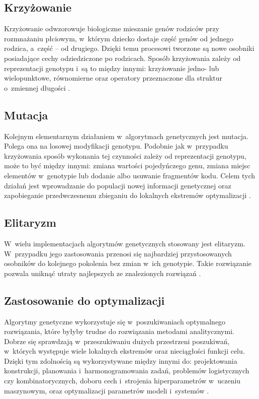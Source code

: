 \tocless\subsection{Krzyżowanie}
Krzyżowanie odwzorowuje biologiczne mieszanie
genów rodziców przy rozmnażaniu płciowym,
w~którym dziecko dostaje część genów
od jednego rodzica, a~część -- od drugiego.
Dzięki temu procesowi tworzone są nowe osobniki
posiadające cechy odziedziczone po rodzicach.
Sposób krzyżowania zależy od reprezentacji genotypu
i~są to między innymi:
krzyżowanie jedno- lub wielopunktowe,
równomierne oraz operatory przeznaczone
dla struktur o~zmiennej długości%
.

\tocless\subsection{Mutacja}
Kolejnym elementarnym działaniem
w~algorytmach genetycznych jest mutacja.
Polega ona na losowej modyfikacji genotypu.
Podobnie jak w~przypadku krzyżowania
sposób wykonania tej czynności zależy
od reprezentacji genotypu,
może to być między innymi:
zmiana wartości pojedyńczego genu,
zmiana miejsc elementów w~genotypie
lub dodanie albo usuwanie
fragmentów kodu.
Celem tych działań jest
wprowadzanie do populacji
nowej informacji genetycznej
oraz zapobieganie przedwczesnemu zbieganiu
do lokalnych ekstremów optymalizacji%
.

\tocless\subsection{Elitaryzm}
W~wielu implementacjach algorytmów genetycznych
stosowany jest elitaryzm.
W~przypadku jego zastosowania przenosi się
najbardziej przystosowanych osobników
do kolejnego pokolenia bez zmian
w~ich genotypie.
Takie rozwiązanie pozwala
uniknąć utraty najlepszych
ze znalezionych rozwiązań%
.

\tocless\subsection{Zastosowanie do optymalizacji}
Algorytmy genetyczne wykorzystuje się
w~poszukiwaniach optymalnego rozwiązania,
które byłyby trudne do rozwiązania
metodami analitycznymi.
Dobrze się sprawdzają w~przeszukiwaniu
dużych przestrzeni poszukiwań,
w~których występuje wiele lokalnych ekstremów
oraz nieciągłości funkcji celu.
Dzięki tym zdolnością są wykorzystywane
między innymi do:
projektowania konstrukcji,
planowania i~harmonogramowania zadań,
problemów logistycznych czy kombinatorycznych,
doboru cech i~strojenia
hiperparametrów w~uczeniu maszynowym,
oraz optymalizacji parametrów modeli i~systemów%
.

